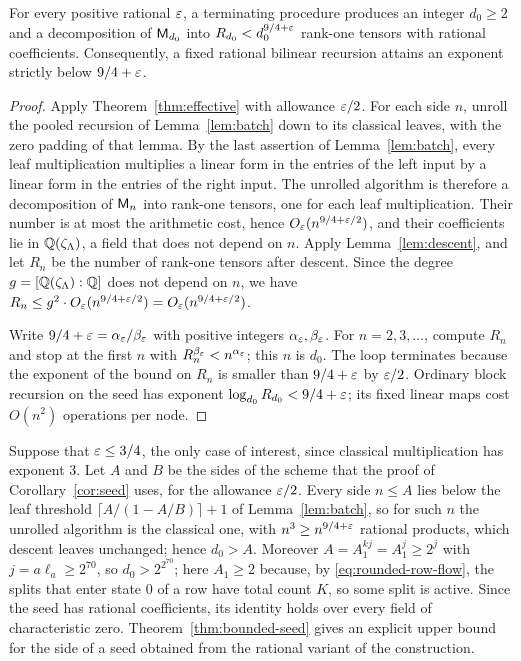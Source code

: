 \begin{corollary}\label{cor:seed}
For every positive rational \(\varepsilon\), a terminating procedure produces
an integer \(d_0\ge2\) and a decomposition of \(\mathsf M_{d_0}\) into
\(R_{d_0}<d_0^{9/4+\varepsilon}\) rank-one tensors with rational coefficients.
Consequently, a fixed rational bilinear recursion attains an exponent
strictly below \(9/4+\varepsilon\).
\end{corollary}

\begin{proof}
Apply Theorem~\ref{thm:effective} with allowance \(\varepsilon/2\). For each
side \(n\), unroll the pooled recursion of Lemma~\ref{lem:batch} down to
its classical leaves, with the zero padding of that lemma. By the last
assertion of Lemma~\ref{lem:batch}, every leaf multiplication
multiplies a linear form in the entries of the left input by a linear
form in the entries of the right input. The unrolled algorithm is
therefore a decomposition of \(\mathsf M_n\) into rank-one tensors, one for
each leaf multiplication. Their number is at most the arithmetic cost,
hence \(O_\varepsilon(n^{9/4+\varepsilon/2})\), and their coefficients lie in
\(\mathbb Q(\zeta_\Lambda)\), a field that does not depend on \(n\). Apply
Lemma~\ref{lem:descent}, and let \(R_n\) be the number of rank-one
tensors after descent. Since the degree
\(g=[\mathbb Q(\zeta_\Lambda):\mathbb Q]\) does not depend on \(n\), we have
\(R_n\le g^2\cdot O_\varepsilon(n^{9/4+\varepsilon/2})=O_\varepsilon(n^{9/4+\varepsilon/2})\).

Write \(9/4+\varepsilon=\alpha_\varepsilon/\beta_\varepsilon\) with positive integers
\(\alpha_\varepsilon,\beta_\varepsilon\). For \(n=2,3,\ldots\), compute \(R_n\) and
stop at the first \(n\) with \(R_n^{\beta_\varepsilon}<n^{\alpha_\varepsilon}\); this
\(n\) is \(d_0\). The loop terminates because the exponent of the bound
on \(R_n\) is smaller than \(9/4+\varepsilon\) by \(\varepsilon/2\). Ordinary block
recursion on the seed has exponent \(\log_{d_0}R_{d_0}<9/4+\varepsilon\); its
fixed linear maps cost \(O(n^2)\) operations per node.
\end{proof}

\begin{remark}\label{rem:seed-size}
Suppose that \(\varepsilon\le3/4\), the only case of interest, since classical
multiplication has exponent \(3\). Let \(A\) and \(B\) be the sides of
the scheme that the proof of Corollary~\ref{cor:seed} uses, for the
allowance \(\varepsilon/2\). Every side \(n\le A\) lies below the leaf
threshold \(\lceil A/(1-A/B)\rceil+1\) of Lemma~\ref{lem:batch}, so for
such \(n\) the unrolled algorithm is the classical one, with
\(n^3\ge n^{9/4+\varepsilon}\) rational products, which descent leaves
unchanged; hence \(d_0>A\). Moreover \(A=A_1^{kj}=A_1^j\ge2^j\) with
\(j=a\ell_a\ge2^{70}\), so \(d_0>2^{2^{70}}\); here \(A_1\ge2\) because,
by \eqref{eq:rounded-row-flow}, the splits that enter state \(0\) of a
row have total count \(K\), so some split is active. Since the seed has
rational coefficients, its identity holds over every field of
characteristic zero. Theorem~\ref{thm:bounded-seed} gives an explicit
upper bound for the side of a seed obtained from the rational variant of
the construction.
\end{remark}
